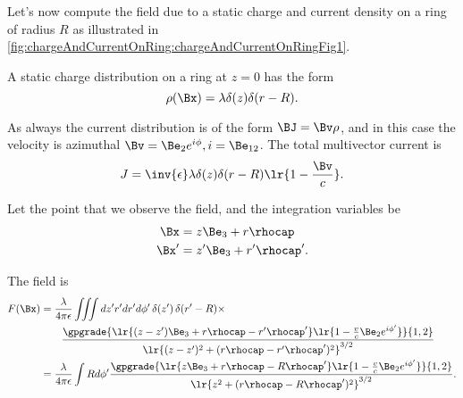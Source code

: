 %
%
Let's now compute the field due to a static charge and current density on a ring of radius \( R \) as illustrated in
\cref{fig:chargeAndCurrentOnRing:chargeAndCurrentOnRingFig1}.


A static charge distribution on a ring at \( z = 0 \) has the form
\begin{dmath}\label{eqn:ringField:20}
\rho(\Bx) = \lambda \delta(z) \delta(r - R).
\end{dmath}

As always the current distribution is of the form \( \BJ = \Bv \rho \), and in this case the velocity is azimuthal \( \Bv = \Be_2 e^{i\phi}, i = \Be_{12} \).
The total multivector current is
\begin{dmath}\label{eqn:ringField:40}
J = \inv{\epsilon} \lambda \delta(z) \delta(r - R) \lr{ 1 - \frac{\Bv}{c} }.
\end{dmath}

Let the point that we observe the field, and the integration variables be
\begin{equation}\label{eqn:ringField:60}
\begin{aligned}
\Bx &= z \Be_3 + r \rhocap \\
\Bx' &= z' \Be_3 + r' \rhocap'.
\end{aligned}
\end{equation}

The field is
\begin{equation}\label{eqn:ringField:80}
\begin{aligned}
F(\Bx)
&= \frac{\lambda}{4 \pi \epsilon} \iiint dz' r' dr' d\phi'\, \delta(z') \, \delta(r' - R) \times \\
&\qquad \frac{\gpgrade{ \lr{ (z - z') \Be_3 + r \rhocap - r' \rhocap' } \lr{ 1 - \frac{v}{c} \Be_2 e^{i\phi'} } }{1,2} } { \lr{ (z-z')^2 + (r \rhocap - r' \rhocap')^2}^{3/2} } \\
&= \frac{\lambda}{4 \pi \epsilon} \int R d\phi' \frac{\gpgrade{ \lr{ z \Be_3 + r \rhocap - R \rhocap' } \lr{ 1 - \frac{v}{c} \Be_2 e^{i\phi'} } }{1,2} } { \lr{ z^2 + (r \rhocap - R \rhocap')^2}^{3/2} }.
\end{aligned}
\end{equation}

